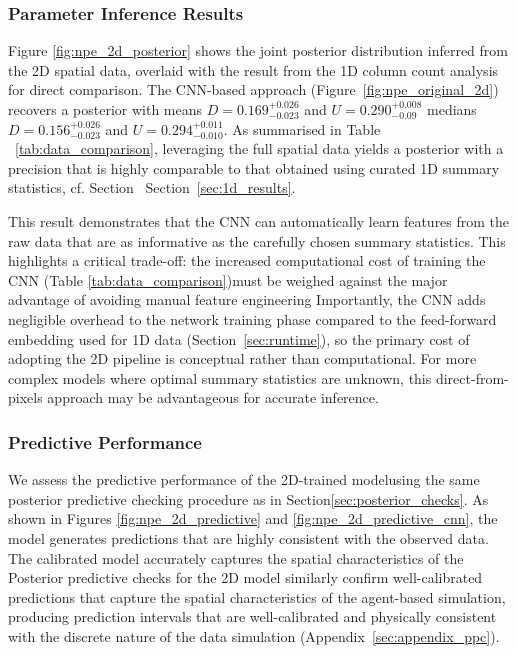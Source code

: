 \documentclass{article}
\providecommand{\DIFaddtex}[1]{{\protect\color{blue} \sf #1}} %
\providecommand{\DIFdeltex}[1]{{\protect\color{red} \scriptsize #1}} %
\providecommand{\DIFaddbegin}{} %
\providecommand{\DIFaddend}{} %
\providecommand{\DIFdelbegin}{} %
\providecommand{\DIFdelend}{} %
\providecommand{\DIFadd}[1]{\texorpdfstring{\DIFaddtex{#1}}{#1}} %
\providecommand{\DIFdel}[1]{\texorpdfstring{\DIFdeltex{#1}}{}} %
\newcommand{\DIFscaledelfig}{0.5}
\newlength{\DIFdelgraphicswidth} %
\newlength{\DIFdelgraphicsheight} %
\newcommand{\DIFaddincludegraphics}[2][]{{\color{blue}\fbox{\DIFOincludegraphics[#1]{#2}}}} %
\newcommand{\DIFdelincludegraphics}[2][]{%
\sbox{\DIFdelgraphicsbox}{\DIFOincludegraphics[#1]{#2}}%
\settoboxwidth{\DIFdelgraphicswidth}{\DIFdelgraphicsbox} %
\settoboxtotalheight{\DIFdelgraphicsheight}{\DIFdelgraphicsbox} %
\scalebox{\DIFscaledelfig}{%
\parbox[b]{\DIFdelgraphicswidth}{\usebox{\DIFdelgraphicsbox}\\[-\baselineskip] \rule{\DIFdelgraphicswidth}{0em}}\llap{\resizebox{\DIFdelgraphicswidth}{\DIFdelgraphicsheight}{%
\setlength{\unitlength}{\DIFdelgraphicswidth}%
\begin{picture}(1,1)%
\thicklines\linethickness{2pt} %
{\color[rgb]{1,0,0}\put(0,0){\framebox(1,1){}}}%
{\color[rgb]{1,0,0}\put(0,0){\line( 1,1){1}}}%
{\color[rgb]{1,0,0}\put(0,1){\line(1,-1){1}}}%
\end{picture}%
}\hspace*{3pt}}} %
} %
\DeclareRobustCommand{\DIFaddbegin}{\DIFOaddbegin \let\includegraphics\DIFaddincludegraphics} %
\DeclareRobustCommand{\DIFaddend}{\DIFOaddend \let\includegraphics\DIFOincludegraphics} %
\DeclareRobustCommand{\DIFdelbegin}{\DIFOdelbegin \let\includegraphics\DIFdelincludegraphics} %
\DeclareRobustCommand{\DIFdelend}{\DIFOaddend \let\includegraphics\DIFOincludegraphics} %
\begin{document}
\DIFdelbegin \subsubsection{\DIFdel{Parameter Inference Results}}
\addtocounter{subsubsection}{-1}%
\DIFdel{Figure \ref{fig:npe_2d_posterior} shows the joint posterior distribution inferred from the 2D spatial data, overlaid with the result from the 1D column count analysis for direct comparison. }\DIFdelend The CNN-based approach \DIFaddbegin \DIFadd{(Figure~\ref{fig:npe_original_2d}) }\DIFaddend recovers a posterior with \DIFdelbegin \DIFdel{means $D = 0.169^{+0.026}_{-0.023}$
 and $U = 0.290^{+0.008}_{-0.09}$}\DIFdelend \DIFaddbegin \DIFadd{medians $D = 0.156^{+0.026}_{-0.023}$
 and $U = 0.294^{+0.011}_{-0.010}$}\DIFaddend . As summarised in Table\DIFaddbegin \DIFadd{~}\DIFaddend \ref{tab:data_comparison}, leveraging the full spatial data yields a posterior with a precision \DIFdelbegin \DIFdel{that is highly }\DIFdelend comparable to that obtained using curated 1D summary statistics, cf.\DIFdelbegin \DIFdel{Section }\DIFdelend \DIFaddbegin \DIFadd{\ Section~}\DIFaddend \ref{sec:1d_results}.

This result demonstrates that the CNN can automatically learn features from the raw data that are as informative as the carefully chosen summary statistics. \DIFdelbegin \DIFdel{This highlights a critical trade-off: the increased computational cost of training the CNN (Table \ref{tab:data_comparison})must be weighed against the major advantage of avoiding manual feature engineering}\DIFdelend \DIFaddbegin \DIFadd{Importantly, the CNN adds negligible overhead to the network training phase compared to the feed-forward embedding used for 1D data (Section~\ref{sec:runtime}), so the primary cost of adopting the 2D pipeline is conceptual rather than computational}\DIFaddend . For more complex models where optimal summary statistics are unknown, this direct-from-pixels approach may be advantageous for accurate inference.

\DIFdelbegin \subsubsection{\DIFdel{Predictive Performance}}
\addtocounter{subsubsection}{-1}%
\DIFdel{We assess the predictive performance of the 2D-trained modelusing the same posterior predictive checking procedure as in Section\ref{sec:posterior_checks}.
As shown in Figures \ref{fig:npe_2d_predictive} and \ref{fig:npe_2d_predictive_cnn}, the model generates predictions that are highly consistent with the observed data.
The calibrated model accurately captures the spatial characteristics of the }\DIFdelend \DIFaddbegin \DIFadd{Posterior predictive checks for the 2D model similarly confirm well-calibrated predictions that capture the spatial characteristics of the }\DIFaddend agent-based \DIFdelbegin \DIFdel{simulation, producing prediction intervals that are well-calibrated and physically consistent with the discrete nature of the data}\DIFdelend \DIFaddbegin \DIFadd{simulation (Appendix~\ref{sec:appendix_ppc}).
}
\end{document}
